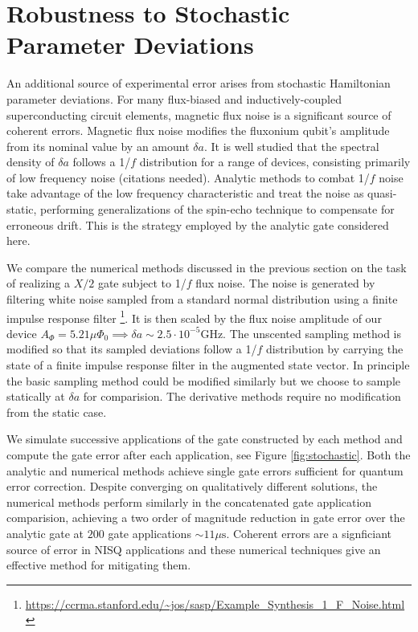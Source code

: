 \section{Robustness to Stochastic Parameter Deviations}
An additional source of experimental error arises from stochastic
Hamiltonian parameter deviations. For many flux-biased and inductively-coupled
superconducting circuit elements, magnetic flux noise is a significant
source of coherent errors. Magnetic flux noise
modifies the fluxonium qubit's amplitude from its nominal value by an amount $\delta a$.
It is well studied that the spectral density of $\delta a$ follows a
1/$f$ distribution for a range of devices, consisting primarily of low frequency
noise (citations needed). Analytic methods to combat 1/$f$ noise
take advantage of the low frequency characteristic and
treat the noise as quasi-static, performing generalizations of the spin-echo technique
to compensate for erroneous drift. This is the strategy employed by the analytic gate
considered here.

We compare the numerical methods discussed in the previous section
on the task of realizing a $X/2$ gate subject to 1/$f$ flux noise.
The noise is generated by
filtering white noise sampled from a standard normal distribution using a finite
impulse response filter \cite{saspweb2011}
\footnote{\url{https://ccrma.stanford.edu/~jos/sasp/Example_Synthesis_1_F_Noise.html}}.
It is then scaled by the 
flux noise amplitude of our device $A_{\Phi} = 5.21 \mu \Phi_{0} \implies
\delta a \sim 2.5 \cdot 10^{-5} \textrm{GHz}$.
The unscented sampling method is modified so that its sampled deviations
follow a 1/$f$ distribution by carrying the state of a finite impulse response filter
in the augmented state vector. In principle the basic sampling method could be modified
similarly but we choose to sample statically at $\delta a$ for comparision. The derivative
methods require no modification from the static case.

We simulate successive applications of the gate constructed by each method and compute the gate error
after each application, see Figure \ref{fig:stochastic}. Both the analytic and numerical methods achieve single gate errors
sufficient for quantum error correction. Despite converging on qualitatively different solutions, the
numerical methods perform similarly in the concatenated gate application comparision, achieving a two
order of magnitude reduction in gate error over the analytic gate at $200$
gate applications $\sim 11 \mu\textrm{s}$.
Coherent errors are a signficiant source of error in NISQ applications and these numerical techniques give
an effective method for mitigating them.
